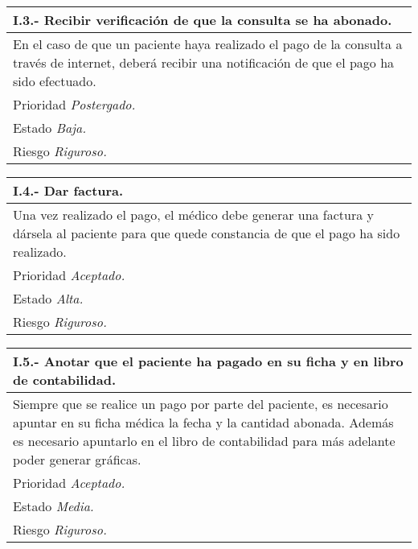 \documentclass[a4paper,oneside,11pt]{book}
\begin{document}
\begin{center}
\begin{tabulary}{15cm}{|L|}
	\hline
		\bf{I.3.- Recibir verificación de que la consulta se ha abonado.} \\
	\hline
		En el caso de que un paciente haya realizado el pago de la consulta a través de internet, deberá recibir una notificación de que el pago ha sido efectuado. \\
	\hline
		Prioridad \textit{Postergado.} \\
	\hline
		Estado \textit{Baja.} \\
	\hline
		Riesgo \textit{Riguroso.} \\
	\hline
\end{tabulary}
\end{center}

\begin{center}
\begin{tabulary}{15cm}{|L|}
	\hline
		\bf{I.4.- Dar factura.} \\
	\hline
		Una vez realizado el pago, el médico debe generar una factura y dársela al paciente para que quede constancia de que el pago ha sido realizado. \\
	\hline
		Prioridad \textit{Aceptado.} \\
	\hline
		Estado \textit{Alta.} \\
	\hline
		Riesgo \textit{Riguroso.} \\
	\hline
\end{tabulary}
\end{center}

\begin{center}
\begin{tabulary}{15cm}{|L|}
	\hline
		\bf{I.5.- Anotar que el paciente ha pagado en su ficha y en libro de contabilidad.} \\
	\hline
		Siempre que se realice un pago por parte del paciente, es necesario apuntar en su ficha médica la fecha y la cantidad abonada. Además es necesario apuntarlo en el libro de contabilidad para más adelante poder generar gráficas. \\
	\hline
		Prioridad \textit{Aceptado.} \\
	\hline
		Estado \textit{Media.} \\
	\hline
		Riesgo \textit{Riguroso.} \\
	\hline
\end{tabulary}
\end{center}
\end{document}
